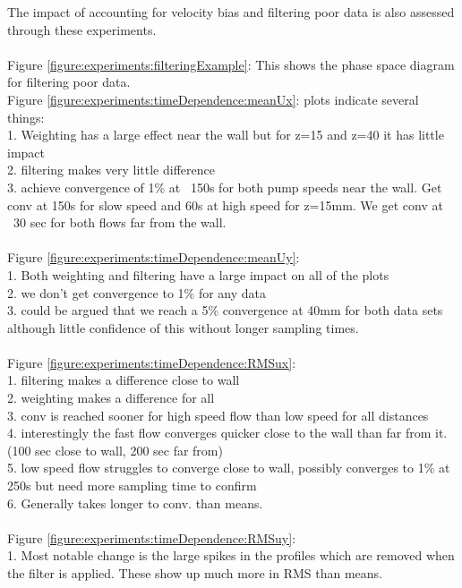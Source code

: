 \documentclass[12pt,oneside,a4paper]{article}
\begin{document}
The impact of accounting for velocity bias and filtering poor data is also assessed through these experiments.
\\\\
Figure \ref{figure:experiments:filteringExample}:	This shows the phase space diagram for filtering poor data. 
\\
Figure \ref{figure:experiments:timeDependence:meanUx}: plots indicate several things:\\
1.	Weighting has a large effect near the wall but for z=15 and z=40 it has little impact\\
2.	filtering makes very little difference\\
3.	achieve convergence of 1\% at ~150s for both pump speeds near the wall. Get conv at 150s for slow speed and 60s at high speed for z=15mm. We get conv at ~30 sec for both flows far from the wall. \\
\\
Figure \ref{figure:experiments:timeDependence:meanUy}:\\
1.	Both weighting and filtering have a large impact on all of the plots\\
2.	we don't get convergence to 1\% for any data\\
3.	could be argued that we reach a 5\% convergence at 40mm for both data sets although little confidence of this without longer sampling times. \\
\\
Figure \ref{figure:experiments:timeDependence:RMSux}:\\
1.	filtering makes a difference close to wall\\
2.	weighting makes a difference for all\\
3.	conv is reached sooner for high speed flow than low speed for all distances\\
4.	interestingly the fast flow converges quicker close to the wall than far from it. (100 sec close to wall, 200 sec far from)\\
5.	low speed flow struggles to converge close to wall, possibly converges to 1\% at 250s but need more sampling time to confirm\\
6.	Generally takes longer to conv. than means.\\
\\
Figure \ref{figure:experiments:timeDependence:RMSuy}:\\
1.	Most notable change is the large spikes in the profiles which are removed when the filter is applied. These show up much more in RMS than means.\\
\end{document}
